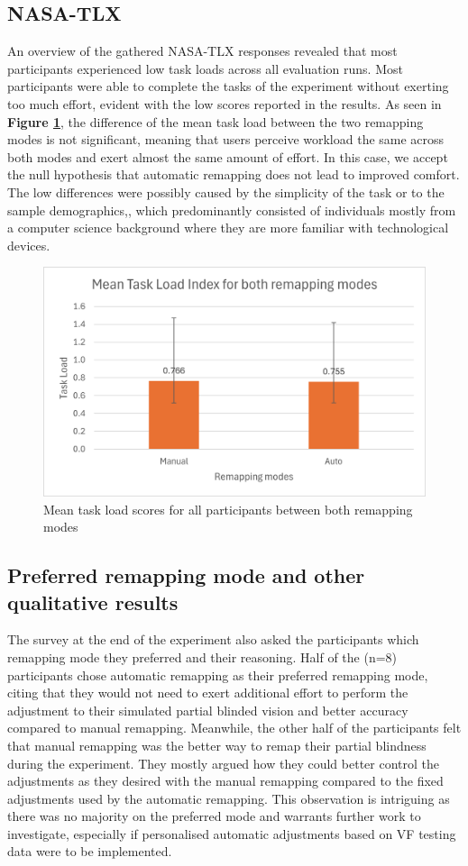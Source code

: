 \documentclass{l4proj}
\begin{document}
\subsection{NASA-TLX}
An overview of the gathered NASA-TLX responses revealed that most participants experienced low task loads across all evaluation runs. Most participants were able to complete the tasks of the experiment without exerting too much effort, evident with the low scores reported in the results. As seen in \textbf{Figure \ref{fig:meanTLX}}, the difference of the mean task load between the two remapping modes is not significant, meaning that users perceive workload the same across both modes and exert almost the same amount of effort. In this case, we accept the null hypothesis that automatic remapping does not lead to improved comfort. The low differences were possibly caused by the simplicity of the task or to the sample demographics,, which predominantly consisted of individuals mostly from a computer science background where they are more familiar with technological devices.


\begin{figure}[!h]
    \centering
    \includegraphics[width=0.7\linewidth]{images/mean-TLX.png}
    \caption{Mean task load scores for all participants between both remapping modes}
    \label{fig:meanTLX}
\end{figure}

\subsection{Preferred remapping mode and other qualitative results}
The survey at the end of the experiment also asked the participants which remapping mode they preferred and their reasoning. Half of the (n=8) participants chose automatic remapping as their preferred remapping mode, citing that they would not need to exert additional effort to perform the adjustment to their simulated partial blinded vision and better accuracy compared to manual remapping. Meanwhile, the other half of the participants felt that manual remapping was the better way to remap their partial blindness during the experiment. They mostly argued how they could better control the adjustments as they desired with the manual remapping compared to the fixed adjustments used by the automatic remapping. This observation is intriguing as there was no majority on the preferred mode and warrants further work to investigate, especially if personalised automatic adjustments based on VF testing data were to be implemented.
\end{document}
